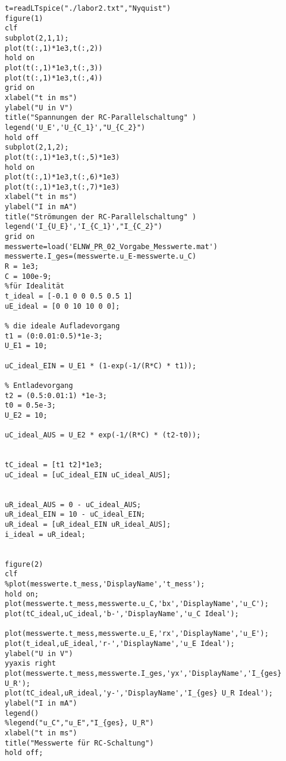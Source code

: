 \begin{verbatim}
t=readLTspice("./labor2.txt","Nyquist")
figure(1)
clf
subplot(2,1,1);
plot(t(:,1)*1e3,t(:,2))
hold on
plot(t(:,1)*1e3,t(:,3))
plot(t(:,1)*1e3,t(:,4))
grid on
xlabel("t in ms")
ylabel("U in V")
title("Spannungen der RC-Parallelschaltung" )
legend('U_E','U_{C_1}',"U_{C_2}")
hold off
subplot(2,1,2);
plot(t(:,1)*1e3,t(:,5)*1e3)
hold on
plot(t(:,1)*1e3,t(:,6)*1e3)
plot(t(:,1)*1e3,t(:,7)*1e3)
xlabel("t in ms")
ylabel("I in mA")
title("Strömungen der RC-Parallelschaltung" )
legend('I_{U_E}','I_{C_1}',"I_{C_2}")
grid on
messwerte=load('ELNW_PR_02_Vorgabe_Messwerte.mat')
messwerte.I_ges=(messwerte.u_E-messwerte.u_C)
R = 1e3;
C = 100e-9;
%für Idealität
t_ideal = [-0.1 0 0 0.5 0.5 1]
uE_ideal = [0 0 10 10 0 0];

% die ideale Aufladevorgang 
t1 = (0:0.01:0.5)*1e-3;                     
U_E1 = 10;

uC_ideal_EIN = U_E1 * (1-exp(-1/(R*C) * t1));

% Entladevorgang
t2 = (0.5:0.01:1) *1e-3;                  
t0 = 0.5e-3;                               
U_E2 = 10;                               

uC_ideal_AUS = U_E2 * exp(-1/(R*C) * (t2-t0));


tC_ideal = [t1 t2]*1e3;                 
uC_ideal = [uC_ideal_EIN uC_ideal_AUS];


uR_ideal_AUS = 0 - uC_ideal_AUS;
uR_ideal_EIN = 10 - uC_ideal_EIN;
uR_ideal = [uR_ideal_EIN uR_ideal_AUS];
i_ideal = uR_ideal;


figure(2)
clf
%plot(messwerte.t_mess,'DisplayName','t_mess');
hold on;
plot(messwerte.t_mess,messwerte.u_C,'bx','DisplayName','u_C');
plot(tC_ideal,uC_ideal,'b-','DisplayName','u_C Ideal');

plot(messwerte.t_mess,messwerte.u_E,'rx','DisplayName','u_E');
plot(t_ideal,uE_ideal,'r-','DisplayName','u_E Ideal');
ylabel("U in V")
yyaxis right
plot(messwerte.t_mess,messwerte.I_ges,'yx','DisplayName','I_{ges} U_R');
plot(tC_ideal,uR_ideal,'y-','DisplayName','I_{ges} U_R Ideal');
ylabel("I in mA")
legend()
%legend("u_C","u_E","I_{ges}, U_R")
xlabel("t in ms")
title("Messwerte für RC-Schaltung")
hold off;
\end{verbatim}

